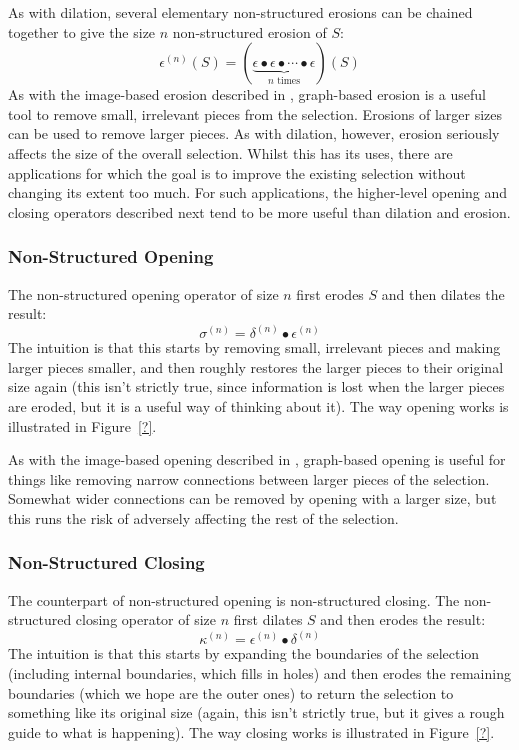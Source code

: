 As with dilation, several elementary non-structured erosions can be chained together to give the size $n$ non-structured erosion of $S$:
%
\[
\epsilon^{(n)}(S) = (\underbrace{\epsilon \bullet \epsilon \bullet \cdots \bullet \epsilon}_{n \mbox{ times}})(S)
\]
%
As with the image-based erosion described in \cite{gonzalez02}, graph-based erosion is a useful tool to remove small, irrelevant pieces from the selection. Erosions of larger sizes can be used to remove larger pieces. As with dilation, however, erosion seriously affects the size of the overall selection. Whilst this has its uses, there are applications for which the goal is to improve the existing selection without changing its extent too much. For such applications, the higher-level opening and closing operators described next tend to be more useful than dilation and erosion.

\subsubsection{Non-Structured Opening}

The non-structured opening operator of size $n$ first erodes $S$ and then dilates the result:
%
\[
\sigma^{(n)} = \delta^{(n)} \bullet \epsilon^{(n)}
\]
%
The intuition is that this starts by removing small, irrelevant pieces and making larger pieces smaller, and then roughly restores the larger pieces to their original size again (this isn't strictly true, since information is lost when the larger pieces are eroded, but it is a useful way of thinking about it). The way opening works is illustrated in Figure~\ref{?}.

As with the image-based opening described in \cite{gonzalez02}, graph-based opening is useful for things like removing narrow connections between larger pieces of the selection. Somewhat wider connections can be removed by opening with a larger size, but this runs the risk of adversely affecting the rest of the selection.

\subsubsection{Non-Structured Closing}

The counterpart of non-structured opening is non-structured closing. The non-structured closing operator of size $n$ first dilates $S$ and then erodes the result:
%
\[
\kappa^{(n)} = \epsilon^{(n)} \bullet \delta^{(n)}
\]
%
The intuition is that this starts by expanding the boundaries of the selection (including internal boundaries, which fills in holes) and then erodes the remaining boundaries (which we hope are the outer ones) to return the selection to something like its original size (again, this isn't strictly true, but it gives a rough guide to what is happening). The way closing works is illustrated in Figure~\ref{?}.

